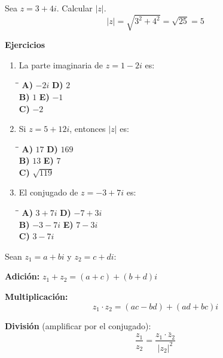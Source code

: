 \documentclass[11pt,a4paper]{article}
\begin{document}
\begin{cajae}
Sea $z=3+4i$. Calcular $|z|$.
\[ |z|=\sqrt{3^2+4^2}=\sqrt{25}=5 \]
\end{cajae}

\textbf{Ejercicios}

\begin{multicols}{2}
\begin{enumerate}[label=\textbf{\arabic*.},start=4]
\item La parte imaginaria de $z = 1-2i$ es:
\begin{tabbing}
\hspace{0.5cm}\=\hspace{3.5cm}\=\kill
\textbf{A)} $-2i$ \> \textbf{D)} $2$ \\
\textbf{B)} $1$ \> \textbf{E)} $-1$ \\
\textbf{C)} $-2$ \\
\end{tabbing}
\item Si $z=5+12i$, entonces $|z|$ es:
\begin{tabbing}
\hspace{0.5cm}\=\hspace{3.5cm}\=\kill
\textbf{A)} $17$ \> \textbf{D)} $169$ \\
\textbf{B)} $13$ \> \textbf{E)} $7$ \\
\textbf{C)} $\sqrt{119}$ \\
\end{tabbing}
\item El conjugado de $z=-3+7i$ es:
\begin{tabbing}
\hspace{0.5cm}\=\hspace{3.5cm}\=\kill
\textbf{A)} $3+7i$ \> \textbf{D)} $-7+3i$ \\
\textbf{B)} $-3-7i$ \> \textbf{E)} $7-3i$ \\
\textbf{C)} $3-7i$ \\
\end{tabbing}
\end{enumerate}
\end{multicols}

\vspace{4mm}
\begin{cajat}
Sean $z_1=a+bi$ y $z_2=c+di$:

\textbf{Adición:} $z_1+z_2=(a+c)+(b+d)i$

\textbf{Multiplicación:}
\[ z_1\cdot z_2=(ac-bd)+(ad+bc)i \]

\textbf{División} (amplificar por el conjugado):
\[ \frac{z_1}{z_2}=\frac{z_1\cdot\bar{z}_2}{|z_2|^2} \]
\end{cajat}
\end{document}
